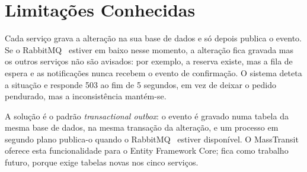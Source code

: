 \section{Limitações Conhecidas}
\label{sec:limitacoes}

Cada serviço grava a alteração na sua base de dados e só depois publica o evento. Se o RabbitMQ~\cite{rabbitmq}
estiver em baixo nesse momento, a alteração fica gravada mas os outros serviços não são avisados:
por exemplo, a reserva existe, mas a fila de espera e as notificações nunca recebem o evento de
confirmação. O sistema deteta a situação e responde 503 ao fim de 5 segundos, em vez de deixar
o pedido pendurado, mas a inconsistência mantém-se.

A solução é o padrão \textit{transactional outbox}: o evento é gravado numa tabela da mesma base de
dados, na mesma transação da alteração, e um processo em segundo plano publica-o quando o
RabbitMQ~\cite{rabbitmq} estiver disponível. O MassTransit oferece esta funcionalidade para o Entity Framework
Core; fica como trabalho futuro, porque exige tabelas novas nos cinco serviços.
